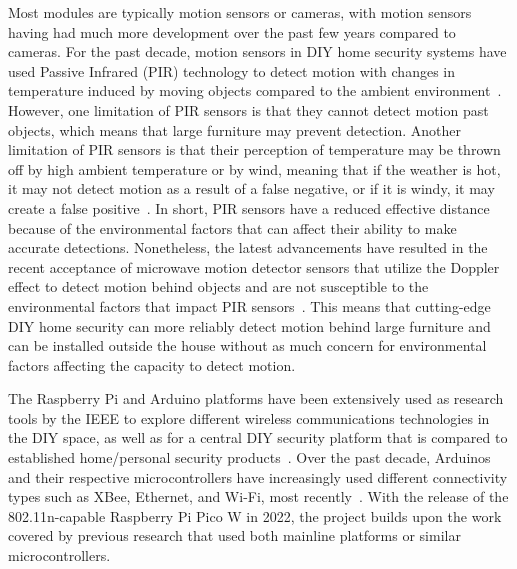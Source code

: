 Most modules are typically motion sensors or cameras, with motion sensors having had
much more development over the past few years compared to cameras. %
For the past decade, motion sensors in DIY home security systems have used Passive Infrared (PIR)
technology to detect motion with changes in temperature induced by moving objects
compared to the ambient environment~\cite{sarhan2020}. %
However, one limitation of PIR sensors is that they cannot detect motion past objects, which means that large
furniture may prevent detection. %
Another limitation of PIR sensors is that their perception of temperature may be thrown off by high ambient temperature or by wind,
meaning that if the weather is hot, it may not detect motion as a result of a
false negative, or if it is windy, it may create a false positive~\cite{sarhan2020}.
In short, PIR sensors have a reduced effective distance because of the environmental
factors that can affect their ability to make accurate detections. %
Nonetheless, the latest advancements have resulted in the recent acceptance of microwave motion
detector sensors that utilize the Doppler effect to detect motion behind objects
and are not susceptible to the environmental factors that impact PIR sensors~\cite{sarhan2020}. %
This means that cutting-edge DIY home security can more reliably detect motion behind
large furniture and can be installed outside the house without as much concern for
environmental factors affecting the capacity to detect motion. %

The Raspberry Pi and Arduino platforms have been extensively used as research tools
by the IEEE to explore different wireless communications technologies in the DIY
space, as well as for a central DIY security platform that is compared to established
home/personal security products~\cite{sarhan2020}. %
Over the past decade, Arduinos and their respective microcontrollers have increasingly used different connectivity types
such as XBee, Ethernet, and Wi-Fi, most recently~\cite{sarhan2020}. %
With the release of the 802.11n-capable Raspberry Pi Pico W in 2022, the project builds upon the work
covered by previous research that used both mainline platforms or similar microcontrollers. %